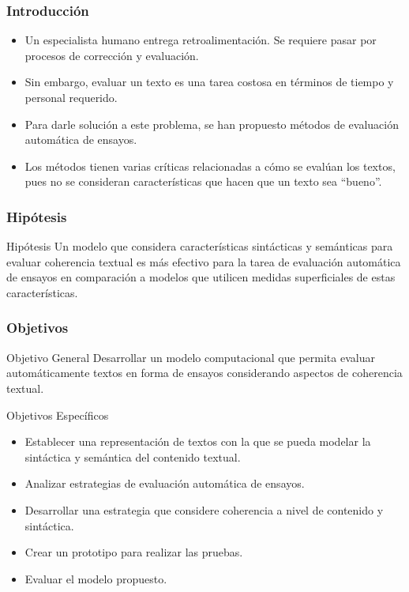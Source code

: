 \documentclass{beamer}
\begin{document}
\begin{frame}
\frametitle{Introducción}
\begin{itemize}
\item Un especialista humano entrega retroalimentación. Se requiere pasar por procesos de corrección y evaluación.
\item Sin embargo, evaluar un texto es una tarea costosa en términos de tiempo y personal requerido.
\item Para darle solución a este problema, se han propuesto métodos de evaluación automática de ensayos.
\item Los métodos tienen varias críticas relacionadas a cómo se evalúan los textos, pues no se consideran características que hacen que un texto sea ``bueno''.
\end{itemize}
\end{frame}

\begin{frame}
\frametitle{Hipótesis}
\begin{block}{Hipótesis}
Un modelo que considera características sintácticas y semánticas para evaluar coherencia textual es más efectivo para la tarea de evaluación automática de ensayos en comparación a modelos que utilicen medidas superficiales de estas características.
\end{block}

\end{frame}

\begin{frame}
\frametitle{Objetivos}
\begin{block}{Objetivo General}
Desarrollar un modelo computacional que permita evaluar automáticamente textos en forma de ensayos considerando aspectos de coherencia textual.
\end{block}

\begin{block}{Objetivos Específicos}
\begin{itemize}
\item Establecer una representación de textos con la que se pueda modelar la sintáctica y semántica del contenido textual.
\item Analizar estrategias de evaluación automática de ensayos.
\item Desarrollar una estrategia que considere coherencia a nivel de contenido y sintáctica.
\item Crear un prototipo para realizar las pruebas.
\item Evaluar el modelo propuesto.
\end{itemize}
\end{block}
\end{frame}
\end{document}
